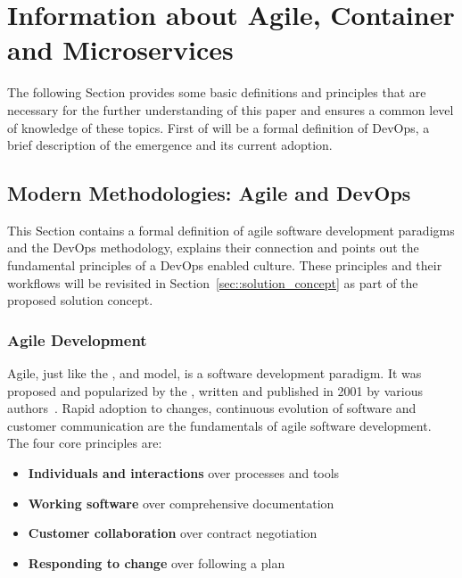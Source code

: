 \documentclass[12pt, a4paper]{article}
\begin{document}
\section{Information about Agile, Container and Microservices}\label{sec::backgrund}
The following Section provides some basic definitions and principles that are necessary for the further understanding of this paper and ensures a common level of knowledge of these topics.\newline
First of will be a formal definition of DevOps, a brief description of the emergence and its current adoption.

    \subsection{Modern Methodologies: Agile and DevOps}\label{ssec::devops}
    This Section contains a formal definition of agile software development paradigms and the DevOps methodology, explains their connection and points out the fundamental principles of a DevOps enabled culture. These principles and their workflows will be revisited in Section~\ref{sec::solution_concept} as part of the proposed solution concept.

        \subsubsection{Agile Development}
        Agile, just like the ,  and  model, is a software development paradigm. It was proposed and popularized by the , written and published in 2001 by various authors~\cite{manifesto}. Rapid adoption to changes, continuous evolution of software and customer communication are the fundamentals of agile software development.\newline
        The four core principles are:

        \begin{itemize}[label=\(\star\)]
            \setlength\itemsep{0em}
            \item \textbf{Individuals and interactions} over processes and tools
            \item \textbf{Working software} over comprehensive documentation
            \item \textbf{Customer collaboration} over contract negotiation
            \item \textbf{Responding to change} over following a plan
        \end{itemize}
\end{document}
